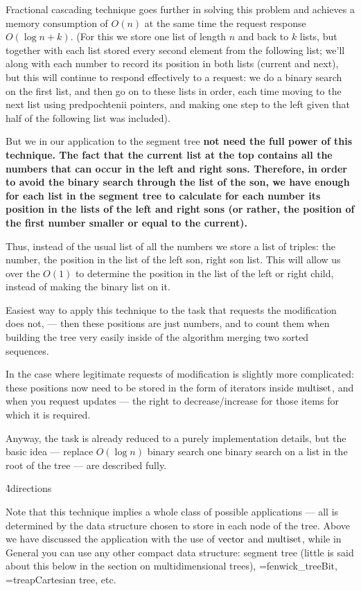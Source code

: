 Fractional cascading technique goes further in solving this problem and achieves a memory consumption of $O (n)$ at the same time the request response $O (\log n + k)$. (For this we store one list of length $n$ and back to $k$ lists, but together with each list stored every second element from the following list; we'll along with each number to record its position in both lists (current and next), but this will continue to respond effectively to a request: we do a binary search on the first list, and then go on to these lists in order, each time moving to the next list using predpochtenii pointers, and making one step to the left given that half of the following list was included).

But we in our application to the segment tree \bf{not need} the full power of this technique. The fact that the current list at the top contains all the numbers that can occur in the left and right sons. Therefore, in order to avoid the binary search through the list of the son, we have enough for each list in the segment tree to calculate for each number its position in the lists of the left and right sons (or rather, the position of the first number smaller or equal to the current).

Thus, instead of the usual list of all the numbers we store a list of triples: the number, the position in the list of the left son, right son list. This will allow us over the $O (1)$ to determine the position in the list of the left or right child, instead of making the binary list on it.

Easiest way to apply this technique to the task that requests the modification does not, --- then these positions are just numbers, and to count them when building the tree very easily inside of the algorithm merging two sorted sequences.

In the case where legitimate requests of modification is slightly more complicated: these positions now need to be stored in the form of iterators inside $\rm multiset$, and when you request updates --- the right to decrease/increase for those items for which it is required.

Anyway, the task is already reduced to a purely implementation details, but the basic idea --- replace $O (\log n)$ binary search one binary search on a list in the root of the tree --- are described fully.

\h4{directions}

Note that this technique implies a whole class of possible applications --- all is determined by the data structure chosen to store in each node of the tree. Above we have discussed the application with the use of $\rm vector$ and $\rm multiset$, while in General you can use any other compact data structure: segment tree (little is said about this below in the section on multidimensional trees), \algohref=fenwick_tree{Bit}, \algohref=treap{Cartesian tree}, etc.



